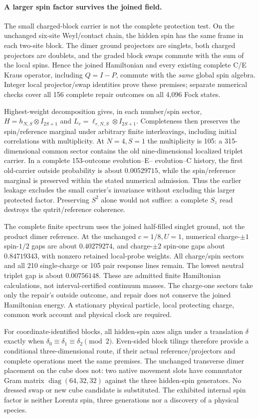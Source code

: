 \paragraph{A larger spin factor survives the joined field.}
The small charged-block carrier is not the complete protection test.
On the unchanged six-site Weyl/contact chain, the hidden spin has the same
frame in each two-site block.  The dimer ground projectors are singlets,
both charged projectors are doublets, and the graded block swaps commute
with the sum of the local spins.  Hence the joined Hamiltonian and every
existing complete C/E Kraus operator, including $Q=I-P$, commute with the
\emph{same} global spin algebra.  Integer local projector/swap identities
prove these premises; separate numerical checks cover all 156 complete
repair outcomes on all 4,096 Fock states.

Highest-weight decomposition gives, in each number/spin sector,
$H=h_{N,S}\otimes I_{2S+1}$ and
$L_r=\ell_{r,N,S}\otimes I_{2S+1}$.  Completeness then preserves the
spin/reference marginal under arbitrary finite interleavings, including
initial correlations with multiplicity.  At $N=4,S=1$ the multiplicity is
105: a 315-dimensional common sector contains the old nine-dimensional
localized triplet carrier.  In a complete 153-outcome evolution--E--
evolution--C history, the first old-carrier outside probability is about
$0.00529715$, while the spin/reference marginal is preserved within the
stated numerical admission.  Thus the earlier leakage excludes the small
carrier's invariance without excluding this larger protected factor.
Preserving $S^2$ alone would not suffice: a complete $S_z$ read destroys
the qutrit/reference coherence.

The complete finite spectrum uses the joined half-filled singlet ground,
not the product dimer reference.  At the unchanged $c=1/8,U=1$, numerical
charge-$\pm1$ spin-$1/2$ gaps are about $0.40279274$, and charge-$\pm2$
spin-one gaps about $0.84719343$, with nonzero retained local-probe
weights.  All charge/spin sectors and all 210 single-charge or 105 pair
response lines remain.  The lowest neutral triplet gap is about
$0.00756148$.  These are admitted finite Hamiltonian calculations, not
interval-certified continuum masses.  The charge-one sectors take only
the repair's outside outcome, and repair does not conserve the joined
Hamiltonian energy.  A stationary physical particle, local protecting
charge, common work account and physical clock are required.

For coordinate-identified blocks, all hidden-spin axes align under a
translation $\delta$ exactly when
$\delta_0\equiv\delta_1\equiv\delta_2\pmod2$.  Even-sided block tilings
therefore provide a conditional three-dimensional route, if their actual
reference/projectors and complete operations meet the same premises.
The unchanged transverse dimer placement on the cube does not: two native
movement slots have commutator Gram matrix $\operatorname{diag}(64,32,32)$
against the three hidden-spin generators.  No dressed swap or new cube
candidate is substituted.  The exhibited internal spin factor is neither
Lorentz spin, three generations nor a discovery of a physical species.
